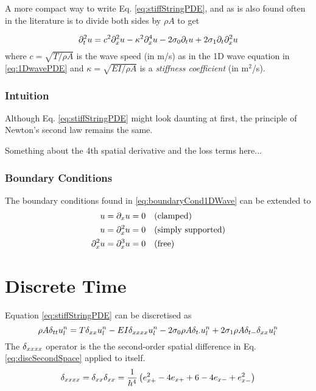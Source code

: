 A more compact way to write Eq. \eqref{eq:stiffStringPDE}, and as is also found often in the literature \cite{theBible}  is to divide both sides by $\rho A$ to get

\begin{equation}
    \partial_t^2 u = c^2 \partial_x^2 u - \kappa^2 \partial_x^4 u - 2 \sigma_{0} \partial_t u + 2 \sigma_{1} \partial_t \partial_x^2 u
\end{equation}
where $c=\sqrt{T/\rho A}$ is the wave speed  (in m/s) as in the 1D wave equation in \eqref{eq:1DwavePDE} and $\kappa = \sqrt{EI / \rho A}$ is a \textit{stiffness coefficient} (in m$^2$/s).

\subsubsection{Intuition}
Although Eq. \eqref{eq:stiffStringPDE} might look daunting at first, the principle of Newton's second law remains the same. 

Something about the 4th spatial derivative and the loss terms here...

\subsubsection{Boundary Conditions}
The boundary conditions found in \eqref{eq:boundaryCond1DWave} can be extended to
\begin{subequations}
    \begin{align}
        u = \partial_x u &= 0 \quad \text{(clamped)}\\
        u = \partial_x^2 u &= 0 \quad \text{(simply supported)}\\
        \partial_x^2 u = \partial_x^3 u &= 0 \quad \text{(free)}
    \end{align}
\end{subequations}

\section{Discrete Time}
Equation \eqref{eq:stiffStringPDE} can be discretised as 
\begin{equation}\label{eq:stiffStringFDS}
    \rho A \delta_{tt} u_l^n = T \delta_{xx} u_l^n - EI \delta_{xxxx} u_l^n - 2 \sigma_{0} \rho A \delta_{t\cdot} u_l^n + 2 \sigma_{1} \rho A \delta_{t-}\delta_{xx} u_l^n
\end{equation}
The $\delta_{xxxx}$ operator is the  the second-order spatial difference in Eq. \eqref{eq:discSecondSpace} applied to itself. 
\begin{equation}\label{eq:dxxxx}
    \delta_{xxxx} = \delta_{xx}\delta_{xx} = \frac{1}{h^4}\left(e_{x+}^2 - 4e_{x+}+6 - 4e_{x-}+e_{x-}^2\right)
\end{equation}

